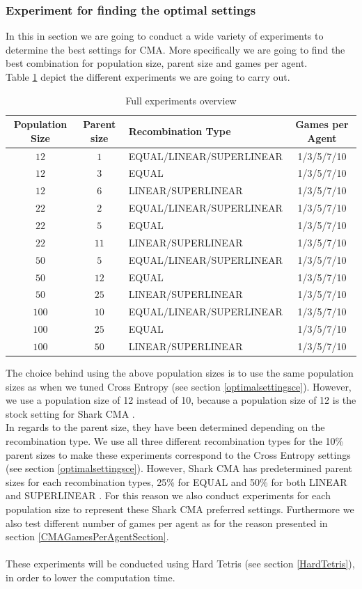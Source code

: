 \subsubsection{Experiment for finding the optimal settings}
In this in section we are going to conduct a wide variety of experiments to determine
the best settings for CMA. More specifically we are going to find the best combination for
population size, parent size and games per agent.\\
Table \ref{SuperCMAExperiment} depict the different experiments we are
going to carry out.

\begin{table}[H]
\centering
\begin{tabular}{c c l c}
Population Size & Parent size & Recombination Type & Games per Agent\\
\hline
$12$ & $1$ & EQUAL/LINEAR/SUPERLINEAR & 1/3/5/7/10\\
$12$ & $3$ & EQUAL & 1/3/5/7/10\\
$12$ & $6$ & LINEAR/SUPERLINEAR & 1/3/5/7/10\\
$22$ & $2$ & EQUAL/LINEAR/SUPERLINEAR & 1/3/5/7/10\\
$22$ & $5$ & EQUAL & 1/3/5/7/10\\
$22$ & $11$ & LINEAR/SUPERLINEAR & 1/3/5/7/10\\
$50$ & $5$ & EQUAL/LINEAR/SUPERLINEAR & 1/3/5/7/10\\
$50$ & $12$ & EQUAL & 1/3/5/7/10\\
$50$ & $25$ & LINEAR/SUPERLINEAR & 1/3/5/7/10\\
$100$ & $10$ & EQUAL/LINEAR/SUPERLINEAR & 1/3/5/7/10\\
$100$ & $25$ & EQUAL & 1/3/5/7/10\\
$100$ & $50$ & LINEAR/SUPERLINEAR & 1/3/5/7/10
\end{tabular}
\caption{Full experiments overview \label{SuperCMAExperiment}}
\end{table}

The choice behind using the above population sizes is to use the same population sizes as
when we tuned Cross Entropy (see section \ref{optimalsettingsce}). However, we use a population
size of 12 instead of 10, because a population size of 12 is the stock setting for Shark CMA \citep{shark08}.\\
In regards to the parent size, they have been determined depending on the recombination type.
We use all three different recombination types for the 10\% parent sizes to make these experiments
correspond to the Cross Entropy settings (see section \ref{optimalsettingsce}). However, Shark CMA
has predetermined parent sizes for each recombination types, 25\% for EQUAL and 50\% for both
LINEAR and SUPERLINEAR \citep{shark08}. For this reason we also conduct experiments for each population
size to represent these Shark CMA preferred settings.
Furthermore we also test different number of games per agent as for the reason presented in section \ref{CMAGamesPerAgentSection}.\\\\
These experiments will be conducted using Hard Tetris (see section \ref{HardTetris}), in order
to lower the computation time.\\

